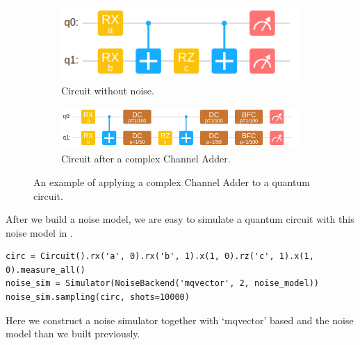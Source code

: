 \begin{figure}
    \centering
    \begin{subfigure}{0.32\textwidth}
        \centering
        \includegraphics[width=\textwidth]{images/4_3_no_complex.png}
        \caption{Circuit without noise.}
    \end{subfigure}
    \begin{subfigure}{0.5\textwidth}
        \centering
        \includegraphics[width=\textwidth]{images/4_3_complex.png}
        \caption{Circuit after a complex Channel Adder.}
    \end{subfigure}
    \caption{An example of applying a complex Channel Adder to a quantum circuit.}
    \label{fig:complex_adder}
\end{figure}

After we build a noise model, we are easy to simulate a quantum circuit with this noise model in \MindQuantum.
\begin{lstlisting}
circ = Circuit().rx('a', 0).rx('b', 1).x(1, 0).rz('c', 1).x(1, 0).measure_all()
noise_sim = Simulator(NoiseBackend('mqvector', 2, noise_model))
noise_sim.sampling(circ, shots=10000)
\end{lstlisting}
Here we construct a noise simulator together with `mqvector' based \NoiseBackend and the noise model than we built previously.
